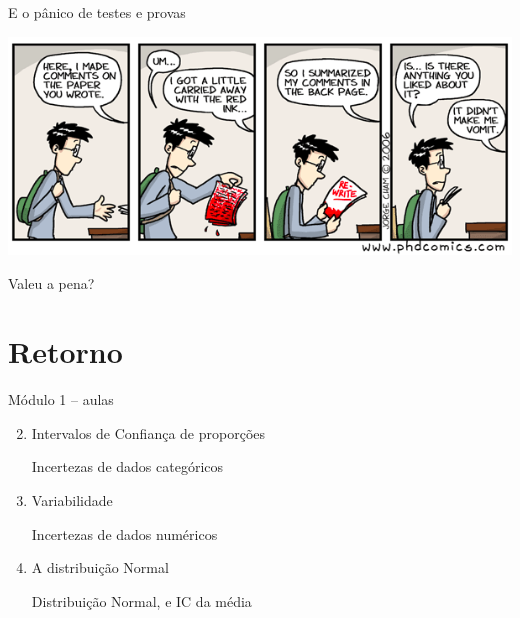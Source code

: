 \documentclass{beamer}
\begin{document}
\begin{frame}{\scriptsize E o pânico de testes e provas}
  \begin{center}
    \includegraphics[width=.8\textwidth]{Encerramento/phdcomics-correcao}

    \vfill
  \end{center}
\end{frame}

\begin{frame}
  \begin{center}
    Valeu a pena?

    \vfill
  \end{center}
\end{frame}

\section{Retorno}

\begin{frame}{\scriptsize Módulo 1 -- aulas}
  \begin{enumerate}
    \setcounter{enumi}{1}
  \item Intervalos de Confiança de proporções

    {\tiny Incertezas de dados categóricos}
    \bigskip
  \item Variabilidade

    {\tiny Incertezas de dados numéricos}
    \bigskip
  \item A distribuição Normal

    {\tiny Distribuição Normal, e IC da média}
  \end{enumerate}
\end{frame}
\end{document}
